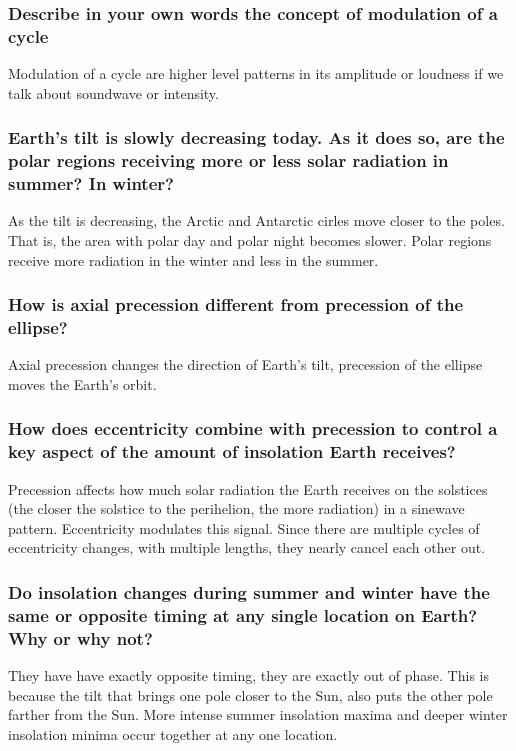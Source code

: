 \subsubsection{Describe in your own words the concept of modulation of a cycle}
Modulation of a cycle are higher level patterns in its amplitude or loudness
if we talk about soundwave or intensity.

\subsubsection{Earth's tilt is slowly decreasing today. As it does so, are the
polar regions receiving more or less solar radiation in summer? In winter?}
As the tilt is decreasing, the Arctic and Antarctic cirles move closer to the
poles. That is, the area with polar day and polar night becomes slower. Polar
regions receive more radiation in the winter and less in the summer.

\subsubsection{How is axial precession different from precession of the
ellipse?}
Axial precession changes the direction of Earth's tilt, precession of the
ellipse moves the Earth's orbit.

\subsubsection{How does eccentricity combine with precession to control a key
aspect of the amount of insolation Earth receives?}
Precession affects how much solar radiation the Earth receives on the
solstices (the closer the solstice to the perihelion, the more radiation) in
a sinewave pattern. Eccentricity modulates this signal.
Since there are multiple cycles of eccentricity changes, with multiple lengths,
they nearly cancel each other out.

\subsubsection{Do insolation changes during summer and winter have the same or
opposite timing at any single location on Earth? Why or why not?}
They have have exactly opposite timing, they are exactly out of phase. This is
because the tilt that brings one pole closer to the Sun, also puts the other
pole farther from the Sun. More intense summer insolation maxima and deeper
winter insolation minima occur together at any one location.

